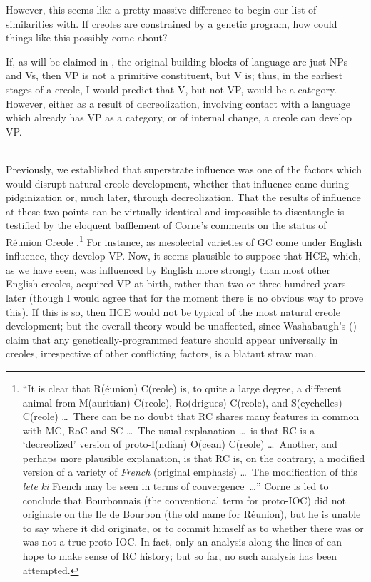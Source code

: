 However, this seems like a pretty massive difference to begin our list of similarities with. If creoles are constrained by a genetic program, how could things like this possibly come about?

If, as will be claimed in , the original building blocks of language are just NPs and Vs, then VP is not a primitive constituent, but V is; thus, in the earliest stages of a creole, I would predict that V, but not VP, would be a category. However, either as a result of decreolization, involving contact with a language which already has VP as a category, or of internal change, a creole can develop VP.\\\\

Previously, we established that superstrate influence was one of the factors which would disrupt natural creole development, whether that influence came during pidginization or, much later, through
decreolization. That the results of influence at these two points can be virtually identical and impossible to disentangle is testified by the eloquent bafflement of Corne's comments on the status of Réunion Creole \citep[223--224]{Corne1977}.\footnote{``It is clear that R(éunion) C(reole) is, to quite a large degree, a different animal from M(auritian) C(reole), Ro(drigues) C(reole), and S(eychelles) C(reole) \ldots~There can be no doubt that RC shares many features in common with MC, RoC and SC \ldots~The usual explanation \ldots~is that RC is a `decreolized' version of proto-I(ndian) O(cean) C(reole) \ldots~Another, and perhaps more plausible explanation, is that RC is, on the contrary, a modified version of a variety of \textit{French} (original emphasis) \ldots~The modification of this \textit{lete} \textit{ki} French may be seen in terms of convergence~\ldots'' Corne is led to conclude that Bourbonnais (the conventional term for proto-IOC) did not originate on the Ile de Bourbon (the old name for Réunion), but he is unable to say where it did originate, or to commit himself as to whether there was or was not a true proto-IOC. In fact, only an analysis along the lines of \citet{Bickerton1975} can hope to make sense of RC history; but so far, no such analysis has been attempted.} For instance, as mesolectal varieties of GC come under English influence, they develop VP. Now, it seems plausible to suppose that HCE, which, as we have seen, was influenced by English more strongly than most other English creoles, acquired VP at birth, rather than two or three hundred years later (though I would agree that for the moment there is no obvious way to prove this). If this is so, then HCE would not be typical of the most natural creole development; but the overall theory would be unaffected, since Washabaugh's (\citeyear{Washabaugh1979}) claim that any genetically-programmed feature should appear universally in creoles, irrespective of other conflicting factors, is a blatant straw man.

